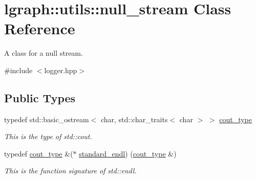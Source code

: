 \hypertarget{classlgraph_1_1utils_1_1null__stream}{}\section{lgraph\+:\+:utils\+:\+:null\+\_\+stream Class Reference}
\label{classlgraph_1_1utils_1_1null__stream}


A class for a null stream.  




{\ttfamily \#include $<$logger.\+hpp$>$}

\subsection*{Public Types}
\begin{DoxyCompactItemize}
\item 
typedef std\+::basic\+\_\+ostream$<$ char, std\+::char\+\_\+traits$<$ char $>$ $>$ \hyperlink{classlgraph_1_1utils_1_1null__stream_ae3f818cbd342cb6da9f15677252da938}{cout\+\_\+type}\hypertarget{classlgraph_1_1utils_1_1null__stream_ae3f818cbd342cb6da9f15677252da938}{}\label{classlgraph_1_1utils_1_1null__stream_ae3f818cbd342cb6da9f15677252da938}

\begin{DoxyCompactList}\small\item\em This is the type of std\+::cout. \end{DoxyCompactList}\item 
typedef \hyperlink{classlgraph_1_1utils_1_1null__stream_ae3f818cbd342cb6da9f15677252da938}{cout\+\_\+type} \&($\ast$ \hyperlink{classlgraph_1_1utils_1_1null__stream_ada7be393792a0f7b90452c981a279d08}{standard\+\_\+endl}) (\hyperlink{classlgraph_1_1utils_1_1null__stream_ae3f818cbd342cb6da9f15677252da938}{cout\+\_\+type} \&)\hypertarget{classlgraph_1_1utils_1_1null__stream_ada7be393792a0f7b90452c981a279d08}{}\label{classlgraph_1_1utils_1_1null__stream_ada7be393792a0f7b90452c981a279d08}

\begin{DoxyCompactList}\small\item\em This is the function signature of std\+::endl. \end{DoxyCompactList}\end{DoxyCompactItemize}
